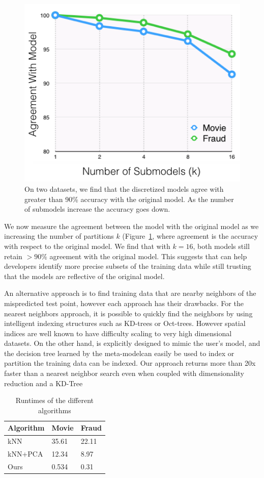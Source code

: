 \begin{figure}[ht]
    \centering
    \includegraphics[width=0.6\columnwidth]{figures/agreement.png}
    \caption{On two datasets, we find that the discretized models agree with greater than 90\% accuracy with the original model. As the number of submodels increase the accuracy goes down.}
    \label{fig:agreement}
\end{figure}

We now measure the agreement between the \sys model with the original model as we increasing the number of partitions $k$ (Figure~\ref{fig:agreement}, where agreement is the accuracy with respect to the original model.
We find that with $k=16$, both \sys models still retain $>90\%$ agreement with the original model.
 This suggests that \sys can help developers identify more precise subsets of the training data while still trusting that the \sys models are reflective of the original model.


An alternative approach is to find training data that are nearby neighbors of the mispredicted test point, however each approach has their drawbacks.
For the nearest neighbors approach, it is possible to quickly find the neighbors by using intelligent indexing structures such as KD-trees or Oct-trees.  However spatial indices are well known to have difficulty scaling to very high dimensional datasets.  
On the other hand, \sys is explicitly designed to mimic the user's model, and the decision tree learned by the meta-modelcan easily be used to index or partition the training data can be indexed.
Our approach returns more than 20x faster than a nearest neighbor search even when coupled with dimensionality reduction and a KD-Tree 

\begin{table}[ht!]
\centering
\caption{Runtimes of the different algorithms}
\label{my-label}
\begin{tabular}{lll}
Algorithm & Movie & Fraud \\ \hline
kNN & 35.61 & 22.11  \\
kNN+PCA & 12.34 & 8.97  \\
Ours & 0.534 & 0.31 
\end{tabular}
\end{table}

